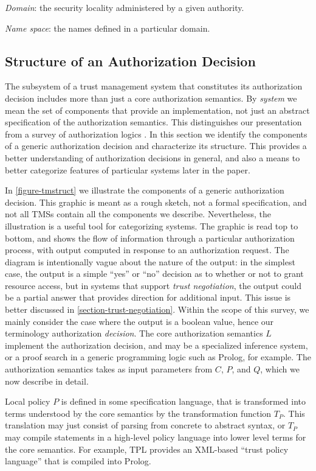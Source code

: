\medskip\emph{Domain}: the security locality administered by a given
authority.

\medskip\emph{Name space}: the names defined in a particular domain.


\subsection{Structure of an Authorization Decision}
\label{section-overview-structure}

The subsystem of a trust management system that constitutes its
authorization decision includes more than just a core authorization
semantics.  By \emph{system} we mean the set of components that
provide an implementation, not just an abstract specification of the
authorization semantics.  This distinguishes our presentation from a
survey of authorization logics \cite{Abadi:LAC}.  In this section we
identify the components of a generic authorization decision and
characterize its structure.  This provides a better understanding of
authorization decisions in general, and also a means to better
categorize features of particular systems later in the paper.

In \autoref{figure-tmstruct} we illustrate the components of a generic
authorization decision.  This graphic is meant as a rough sketch, not
a formal specification, and not all TMSs contain all the components we
describe.  Nevertheless, the illustration is a useful tool for
categorizing systems.  The graphic is read top to bottom, and shows
the flow of information through a particular authorization process,
with output computed in response to an authorization request.  The
diagram is intentionally vague about the nature of the output: in the
simplest case, the output is a simple ``yes'' or ``no'' decision as to
whether or not to grant resource access, but in systems that support
\emph{trust negotiation}, the output could be a partial answer that
provides direction for additional input.  This issue is better
discussed in \autoref{section-trust-negotiation}.  Within the scope of
this survey, we mainly consider the case where the output is a boolean
value, hence our terminology authorization \emph{decision}.  The core
authorization semantics $L$ implement the authorization decision, and
may be a specialized inference system, or a proof search in a generic
programming logic such as Prolog, for example.  The authorization
semantics takes as input parameters from $C$, $P$, and $Q$, which we
now describe in detail.

Local policy $P$ is defined in some specification language, that is
transformed into terms understood by the core semantics by the
transformation function $T_P$.  This translation may just consist of
parsing from concrete to abstract syntax, or $T_P$ may compile
statements in a high-level policy language into lower level terms for
the core semantics.  For example, TPL \cite{Herzberg:ACMPKI} provides
an XML-based ``trust policy language'' that is compiled into Prolog.

